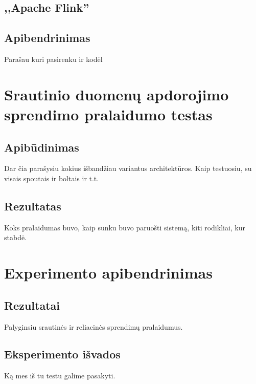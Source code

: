 \documentclass{VUMIFPSkursinis}
\begin{document}
\subsection{,,Apache Flink''}

\subsection{Apibendrinimas}

Parašau kuri pasirenku ir kodėl

\section{Srautinio duomenų apdorojimo sprendimo pralaidumo testas}

\subsection{Apibūdinimas}

Dar čia parašysiu kokius išbandžiau variantus architektūros.
Kaip testuosiu, su visais spoutais ir boltais ir t.t.

\subsection{Rezultatas}

Koks pralaidumas buvo, kaip sunku buvo paruošti sistemą, kiti rodikliai, kur stabdė.

\section{Experimento apibendrinimas}

\subsection{Rezultatai}

Palyginsiu srautinės ir reliacinės sprendimų pralaidumus.

\subsection{Eksperimento išvados}

Ką mes iš tu testu galime pasakyti.
\end{document}
